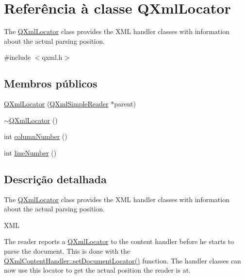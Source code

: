 \hypertarget{class_q_xml_locator}{\section{Referência à classe Q\-Xml\-Locator}
\label{class_q_xml_locator}
}


The \hyperlink{class_q_xml_locator}{Q\-Xml\-Locator} class provides the X\-M\-L handler classes with information about the actual parsing position.  




{\ttfamily \#include $<$qxml.\-h$>$}

\subsection*{Membros públicos}
\begin{DoxyCompactItemize}
\item 
\hyperlink{class_q_xml_locator_aea56218e7ed9eb2899f6caae12eeadb0}{Q\-Xml\-Locator} (\hyperlink{class_q_xml_simple_reader}{Q\-Xml\-Simple\-Reader} $\ast$parent)
\item 
\hyperlink{class_q_xml_locator_aa64d2598c67d855c95e7836115ac6305}{$\sim$\-Q\-Xml\-Locator} ()
\item 
int \hyperlink{class_q_xml_locator_a8600aba4b58138b76472fdb40f325bcd}{column\-Number} ()
\item 
int \hyperlink{class_q_xml_locator_a4bc010d37f882a7895ca5b642dc65735}{line\-Number} ()
\end{DoxyCompactItemize}


\subsection{Descrição detalhada}
The \hyperlink{class_q_xml_locator}{Q\-Xml\-Locator} class provides the X\-M\-L handler classes with information about the actual parsing position. 

X\-M\-L

The reader reports a \hyperlink{class_q_xml_locator}{Q\-Xml\-Locator} to the content handler before he starts to parse the document. This is done with the \hyperlink{class_q_xml_content_handler_a02c1b0a6086c5d232ae919bbc5abb740}{Q\-Xml\-Content\-Handler\-::set\-Document\-Locator()} function. The handler classes can now use this locator to get the actual position the reader is at. 

